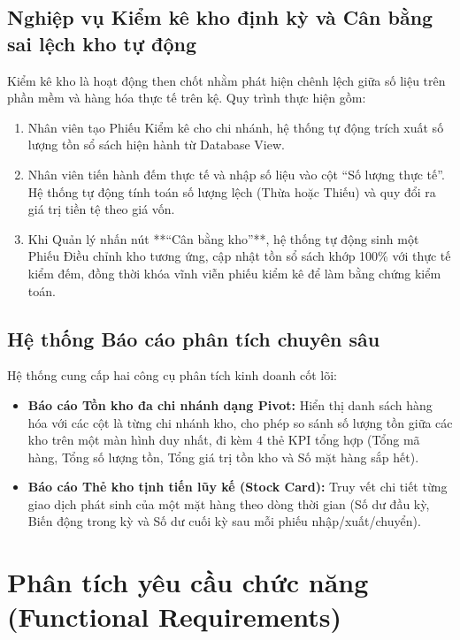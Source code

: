 \documentclass[12pt,a4paper]{report}
\renewcommand{\_}{\textunderscore\allowbreak}
\begin{document}
\subsection{Nghiệp vụ Kiểm kê kho định kỳ và Cân bằng sai lệch kho tự động}
Kiểm kê kho là hoạt động then chốt nhằm phát hiện chênh lệch giữa số liệu trên phần mềm và hàng hóa thực tế trên kệ. Quy trình thực hiện gồm:
\begin{enumerate}
    \item Nhân viên tạo Phiếu Kiểm kê cho chi nhánh, hệ thống tự động trích xuất số lượng tồn sổ sách hiện hành từ Database View.
    \item Nhân viên tiến hành đếm thực tế và nhập số liệu vào cột ``Số lượng thực tế''. Hệ thống tự động tính toán số lượng lệch (Thừa hoặc Thiếu) và quy đổi ra giá trị tiền tệ theo giá vốn.
    \item Khi Quản lý nhấn nút **``Cân bằng kho''**, hệ thống tự động sinh một Phiếu Điều chỉnh kho tương ứng, cập nhật tồn sổ sách khớp 100\% với thực tế kiểm đếm, đồng thời khóa vĩnh viễn phiếu kiểm kê để làm bằng chứng kiểm toán.
\end{enumerate}

\subsection{Hệ thống Báo cáo phân tích chuyên sâu}
Hệ thống cung cấp hai công cụ phân tích kinh doanh cốt lõi:
\begin{itemize}
    \item \textbf{Báo cáo Tồn kho đa chi nhánh dạng Pivot:} Hiển thị danh sách hàng hóa với các cột là từng chi nhánh kho, cho phép so sánh số lượng tồn giữa các kho trên một màn hình duy nhất, đi kèm 4 thẻ KPI tổng hợp (Tổng mã hàng, Tổng số lượng tồn, Tổng giá trị tồn kho và Số mặt hàng sắp hết).
    \item \textbf{Báo cáo Thẻ kho tịnh tiến lũy kế (Stock Card):} Truy vết chi tiết từng giao dịch phát sinh của một mặt hàng theo dòng thời gian (Số dư đầu kỳ, Biến động trong kỳ và Số dư cuối kỳ sau mỗi phiếu nhập/xuất/chuyển).
\end{itemize}

\section{Phân tích yêu cầu chức năng (Functional Requirements)}
\end{document}
